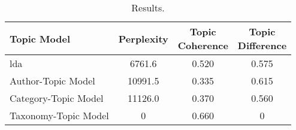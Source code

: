 \begin{table}[h]
	\centering
	\caption{Results.}
	\begin{tabular}{l|c|c|c}
		Topic Model & Perplexity & \makecell{Topic \\ Coherence} & \makecell{Topic \\ Difference} \\
		\midrule
		\Acrlong{lda} & 6761.6 & 0.520 & 0.575 \\
		Author-Topic Model & 10991.5 & 0.335 & 0.615 \\
		Category-Topic Model & 11126.0 & 0.370 & 0.560 \\
		Taxonomy-Topic Model & 0 & 0.660 & 0 \\
	\end{tabular}
	\label{tab:metric_results}
\end{table}